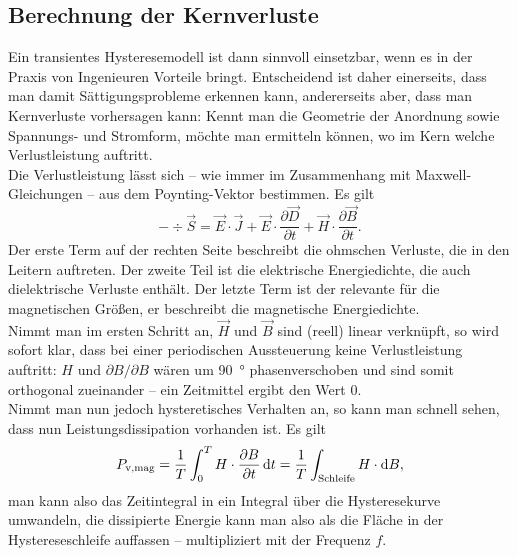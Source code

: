 \documentclass{scrartcl}
\begin{document}
\subsection{Berechnung der Kernverluste}
Ein transientes Hysteresemodell ist dann sinnvoll einsetzbar, wenn es in der Praxis von Ingenieuren Vorteile bringt. Entscheidend ist daher einerseits, dass man damit Sättigungsprobleme erkennen kann, andererseits aber, dass man Kernverluste vorhersagen kann: Kennt man die Geometrie der Anordnung sowie Spannungs- und Stromform, möchte man ermitteln können, wo im Kern welche Verlustleistung auftritt.\\
Die Verlustleistung lässt sich -- wie immer im Zusammenhang mit Maxwell-Gleichungen -- aus dem Poynting-Vektor bestimmen. Es gilt
\begin{equation}
	- \div\vec S = \vec E \cdot \vec J + \vec E \cdot \frac{\partial \vec D}{\partial t} + \vec H \cdot \frac{\partial \vec B}{\partial t}.
\end{equation}
Der erste Term auf der rechten Seite beschreibt die ohmschen Verluste, die in den Leitern auftreten. Der zweite Teil ist die elektrische Energiedichte, die auch dielektrische Verluste enthält. Der letzte Term ist der relevante für die magnetischen Größen, er beschreibt die magnetische Energiedichte.\\
Nimmt man im ersten Schritt an, $\vec H$ und $\vec B$ sind (reell) linear verknüpft, so wird sofort klar, dass bei einer periodischen Aussteuerung keine Verlustleistung auftritt: $H$ und $\partial B/\partial B$ wären um \SI{90}{\degree} phasenverschoben und sind somit orthogonal zueinander -- ein Zeitmittel ergibt den Wert 0.\\
Nimmt man nun jedoch hysteretisches Verhalten an, so kann man schnell sehen, dass nun Leistungsdissipation vorhanden ist. Es gilt
\begin{equation}
	P_{\text{v,mag}} = \frac{1}{T}\int_0^T  H \cdot \frac{\partial  B}{\partial t} \mathop{}\!\mathrm{d} t = \frac{1}{T}\int_{\text{Schleife}}  H \cdot \mathop{}\!\mathrm{d} B,
\end{equation}
man kann also das Zeitintegral in ein Integral über die Hysteresekurve umwandeln, die dissipierte Energie kann man also als die Fläche in der Hystereseschleife auffassen -- multipliziert mit der Frequenz $f$.
\end{document}
